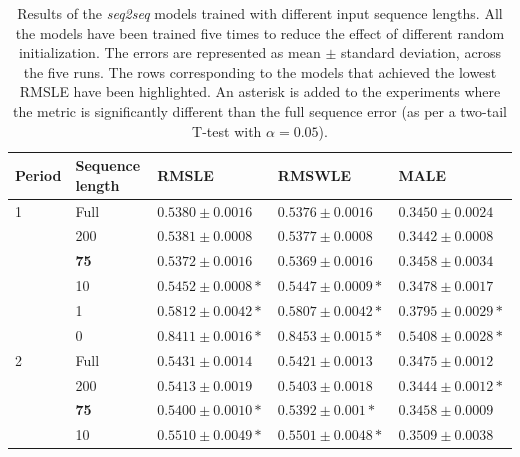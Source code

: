 	\begin{table}[h]
	\footnotesize
	\caption[Results for the sequence length ablation study]{Results of the \textit{seq2seq} models trained with different input sequence lengths. All the models have been trained five times to reduce the effect of different random initialization. The errors are represented as mean $\pm$ standard deviation, across the five runs. The rows corresponding to the models that achieved the lowest RMSLE have been highlighted. An asterisk is added to the experiments where the metric is significantly different than the full sequence error (as per a two-tail T-test with $\alpha=0.05$).}
	\label{tab:salesforecast_results_ablation_length}
	\centering
	\begin{tabular}{lllll}
		\hline
		Period & Sequence length & RMSLE                           & RMSWLE                         & MALE                           \\ \hline
		1      & Full            & $ 0.5380 \pm 0.0016 $           & $ 0.5376 \pm 0.0016 $          & $  0.3450 \pm 0.0024$          \\
      & 200             & $ 0.5381 \pm 0.0008 $           & $ 0.5377 \pm 0.0008 $          & $ 0.3442 \pm 0.0008 $          \\
      & \textbf{75}     & $ \mathbf{0.5372 \pm 0.0016} $  & $ \mathbf{0.5369 \pm 0.0016} $ & $ \mathbf{0.3458 \pm 0.0034} $ \\
      & 10              & $ 0.5452 \pm 0.0008 *$          & $ 0.5447 \pm 0.0009 *$         & $ 0.3478 \pm 0.0017 $          \\
      & 1               & $ 0.5812 \pm 0.0042 *$          & $ 0.5807 \pm 0.0042 *$         & $ 0.3795 \pm 0.0029 *$          \\
      & 0               & $ 0.8411 \pm 0.0016 *$          & $ 0.8453 \pm 0.0015 *$         & $ 0.5408 \pm 0.0028 *$          \\ \hline
		2      & Full            & $ 0.5431 \pm 0.0014 $           & $ 0.5421 \pm 0.0013 $          & $ 0.3475 \pm 0.0012 $          \\
      & 200             & $ 0.5413 \pm 0.0019 $           & $ 0.5403 \pm 0.0018 $          & $ 0.3444 \pm 0.0012 *$          \\
      & \textbf{75}     & $ \mathbf{0.5400 \pm 0.0010}* $ & $ \mathbf{0.5392 \pm 0.001}* $ & $ \mathbf{0.3458 \pm 0.0009} $ \\
      & 10              & $ 0.5510 \pm 0.0049 *$          & $ 0.5501 \pm 0.0048 *$         & $ 0.3509 \pm 0.0038 $          \\

\end{tabular}
\end{table}
